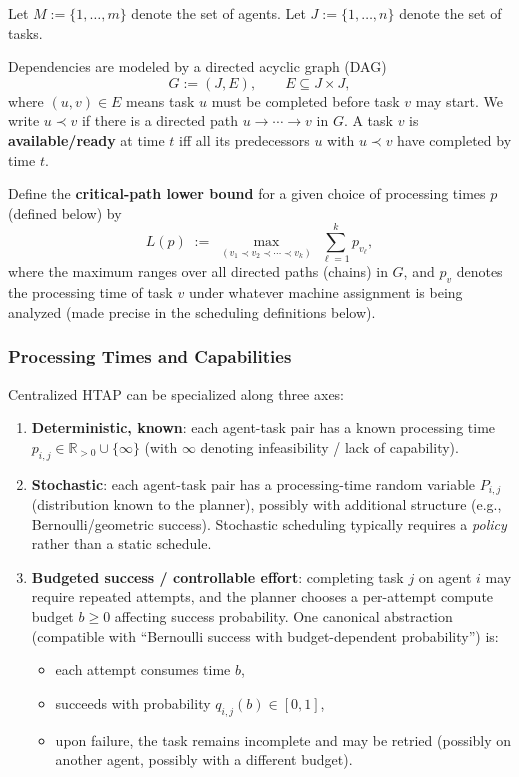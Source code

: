 Let \(M := \{1,\dots,m\}\) denote the set of agents. Let \(J := \{1,\dots,n\}\) denote the set of tasks.

Dependencies are modeled by a directed acyclic graph (DAG)
\[
G := (J, E),\qquad E \subseteq J\times J,
\]
where \((u,v)\in E\) means task \(u\) must be completed before task \(v\) may start. We write \(u\prec v\) if there is a directed path \(u\to\cdots\to v\) in \(G\). A task \(v\) is \textbf{available/ready} at time \(t\) iff all its predecessors \(u\) with \(u\prec v\) have completed by time \(t\).

Define the \textbf{critical-path lower bound} for a given choice of processing times \(p\) (defined below) by
\[
L(p) \;:=\; \max_{(v_1\prec v_2\prec \cdots \prec v_k)}\;\sum_{\ell=1}^k p_{v_\ell},
\]
where the maximum ranges over all directed paths (chains) in \(G\), and \(p_{v}\) denotes the processing time of task \(v\) under whatever machine assignment is being analyzed (made precise in the scheduling definitions below).

\subsubsection{Processing Times and Capabilities}

Centralized HTAP can be specialized along three axes:

\begin{enumerate}
\item \textbf{Deterministic, known}: each agent-task pair has a known processing time \(p_{i,j}\in \mathbb{R}_{>0}\cup\{\infty\}\) (with \(\infty\) denoting infeasibility / lack of capability).

\item \textbf{Stochastic}: each agent-task pair has a processing-time random variable \(P_{i,j}\) (distribution known to the planner), possibly with additional structure (e.g., Bernoulli/geometric success). Stochastic scheduling typically requires a \emph{policy} rather than a static schedule.

\item \textbf{Budgeted success / controllable effort}: completing task \(j\) on agent \(i\) may require repeated attempts, and the planner chooses a per-attempt compute budget \(b\ge 0\) affecting success probability. One canonical abstraction (compatible with ``Bernoulli success with budget-dependent probability'') is:
\begin{itemize}
\item each attempt consumes time \(b\),
\item succeeds with probability \(q_{i,j}(b)\in[0,1]\),
\item upon failure, the task remains incomplete and may be retried (possibly on another agent, possibly with a different budget).
\end{itemize}
\end{enumerate}

